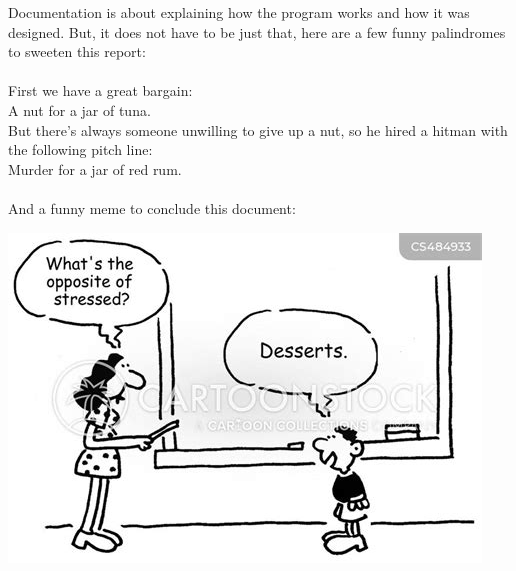 \documentclass[letterpaper, 10pt]{article}
\begin{document}
Documentation is about explaining how the program works and how it was designed. But, it does not have to be just that, here are a few funny palindromes to sweeten this report:
\\
\\
First we have a great bargain:\\
A nut for a jar of tuna.\\
But there's always someone unwilling to give up a nut, so he hired a hitman with the following pitch line:\\
Murder for a jar of red rum.
\\
\\
And a funny meme to conclude this document:\\
\begin{center}
    \includegraphics[scale=0.3]{images/palindromeMeme.jpg}
\end{center}
\end{document}

